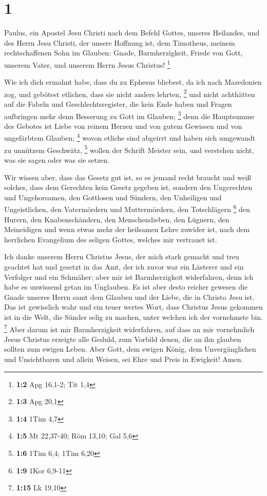 \hypertarget{section}{%
\section{1}\label{section}}

 Paulus, ein Apostel Jesu Christi nach dem Befehl Gottes,
unseres Heilandes, und des Herrn Jesu Christi, der unsere Hoffnung ist,
 dem Timotheus, meinem rechtschaffenen Sohn im Glauben:
Gnade, Barmherzigkeit, Friede von Gott, unserem Vater, und unserem Herrn
Jesus Christus! \footnote{\textbf{1:2} Apg 16,1-2; Tit 1,4}

 Wie ich dich ermahnt habe, dass du zu Ephesus bliebest, da
ich nach Mazedonien zog, und gebötest etlichen, dass sie nicht anders
lehrten, \footnote{\textbf{1:3} Apg 20,1}  und nicht
achthätten auf die Fabeln und Geschlechtsregister, die kein Ende haben
und Fragen aufbringen mehr denn Besserung zu Gott im Glauben;
\footnote{\textbf{1:4} 1Tim 4,7}  denn die Hauptsumme des
Gebotes ist Liebe von reinem Herzen und von gutem Gewissen und von
ungefärbtem Glauben; \footnote{\textbf{1:5} Mt 22,37-40; Röm 13,10; Gal
  5,6}  wovon etliche sind abgeirrt und haben sich umgewandt
zu unnützem Geschwätz, \footnote{\textbf{1:6} 1Tim 6,4; 1Tim 6,20}
 wollen der Schrift Meister sein, und verstehen nicht, was
sie sagen oder was sie setzen.

 Wir wissen aber, dass das Gesetz gut ist, so es jemand
recht braucht  und weiß solches, dass dem Gerechten kein
Gesetz gegeben ist, sondern den Ungerechten und Ungehorsamen, den
Gottlosen und Sündern, den Unheiligen und Ungeistlichen, den
Vatermördern und Muttermördern, den Totschlägern \footnote{\textbf{1:9}
  1Kor 6,9-11}  den Hurern, den Knabenschändern, den
Menschendieben, den Lügnern, den Meineidigen und wenn etwas mehr der
heilsamen Lehre zuwider ist,  nach dem herrlichen
Evangelium des seligen Gottes, welches mir vertrauet ist.

 Ich danke unserem Herrn Christus Jesus, der mich stark
gemacht und treu geachtet hat und gesetzt in das Amt,  der
ich zuvor war ein Lästerer und ein Verfolger und ein Schmäher; aber mir
ist Barmherzigkeit widerfahren, denn ich habe es unwissend getan im
Unglauben.  Es ist aber desto reicher gewesen die Gnade
unseres Herrn samt dem Glauben und der Liebe, die in Christo Jesu ist.
 Das ist gewisslich wahr und ein teuer wertes Wort, dass
Christus Jesus gekommen ist in die Welt, die Sünder selig zu machen,
unter welchen ich der vornehmste bin. \footnote{\textbf{1:15} Lk 19,10}
 Aber darum ist mir Barmherzigkeit widerfahren, auf dass an
mir vornehmlich Jesus Christus erzeigte alle Geduld, zum Vorbild denen,
die an ihn glauben sollten zum ewigen Leben.  Aber Gott,
dem ewigen König, dem Unvergänglichen und Unsichtbaren und allein
Weisen, sei Ehre und Preis in Ewigkeit! Amen.

